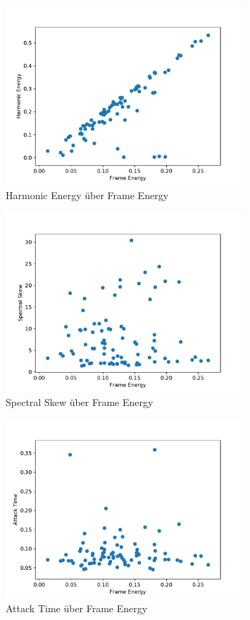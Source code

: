 \begin{figure}[H]
    \center
    \includegraphics[width = 0.8\textwidth]{Figures/harmonicErg}
    \caption{Harmonic Energy über Frame Energy }
    \label{fig:harmonic_energy}
\end{figure}

\begin{figure}[H]
    \center
    \includegraphics[width = 0.8\textwidth]{Figures/specSkew.pdf}
    \caption{Spectral Skew über Frame Energy}
    \label{fig:spectral_skew}
\end{figure}

\begin{figure}[H]
    \center
    \includegraphics[width = 0.8\textwidth]{Figures/att.pdf}
    \caption{Attack Time über Frame Energy}
    \label{fig:attack_time}
\end{figure}

